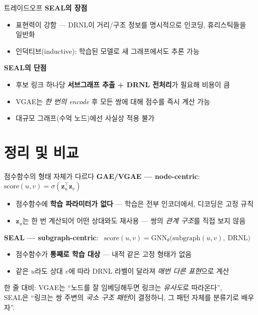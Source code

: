 \begin{frame}{트레이드오프}
\textbf{SEAL의 장점}
\begin{itemize}
  \item 표현력이 강함 — DRNL이 거리/구조 정보를 명시적으로 인코딩, 휴리스틱들을 일반화
  \item 인덕티브(inductive): 학습된 모델로 새 그래프에서도 추론 가능
\end{itemize}
\vspace{0.4em}
\textbf{SEAL의 단점}
\begin{itemize}
  \item 후보 링크 하나당 \textbf{서브그래프 추출 + DRNL 전처리}가 필요해 비용이 큼
  \item VGAE는 \emph{한 번의 encode} 후 모든 쌍에 대해 점수를 즉시 계산 가능
  \item 대규모 그래프(수억 노드)에선 사실상 적용 불가
\end{itemize}
\end{frame}

\section{정리 및 비교}

\begin{frame}{점수함수의 형태 자체가 다르다}
\small
\textbf{GAE/VGAE — node-centric}: \ $\mathrm{score}(u,v) = \sigma(\mathbf{z}_u^\top\mathbf{z}_v)$
\begin{itemize}
  \item 점수함수에 \textbf{학습 파라미터가 없다} — 학습은 전부 인코더에서, 디코딩은 고정 규칙
  \item $\mathbf{z}_u$는 한 번 계산되어 어떤 상대와도 재사용 — 쌍의 \emph{관계 구조}를 직접 보지 않음
\end{itemize}
\vspace{0.4em}
\textbf{SEAL — subgraph-centric}: \ $\mathrm{score}(u,v) = \mathrm{GNN}_\theta\bigl(\mathrm{subgraph}(u,v),\ \mathrm{DRNL}\bigr)$
\begin{itemize}
  \item 점수함수가 \textbf{통째로 학습 대상} — 내적 같은 고정 형태가 없음
  \item 같은 $u$라도 상대 $v$에 따라 DRNL 라벨이 달라져 \emph{매번 다른 표현}으로 계산
\end{itemize}
\vspace{0.5em}
한 줄 대비: VGAE는 ``노드를 잘 임베딩해두면 링크는 \emph{유사도}로 따라온다'',\\
SEAL은 ``링크는 쌍 주변의 \emph{국소 구조 패턴}이 결정하니, 그 패턴 자체를 분류기로 배우자''.
\end{frame}


